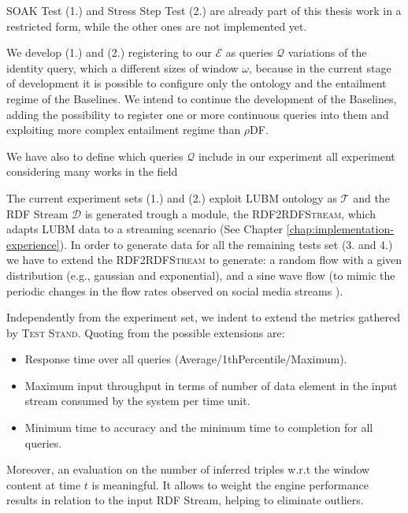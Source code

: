 SOAK Test (1.) and Stress Step Test (2.) are already part of this thesis work in a restricted form, while the other ones are not implemented yet. 

We develop (1.) and (2.) registering to our $\mathcal{E}$ as queries $\mathcal{Q}$ variations of the identity query, which a different sizes of window $\omega$, because in the current stage of development it is possible to configure only the ontology and the entailment regime of the Baselines. We intend to continue the development of the Baselines, adding the possibility to register one or more continuous queries into them and exploiting more complex entailment regime than $\rho$DF. 

We have also to define which queries $\mathcal{Q}$ include in our experiment all experiment considering many works in the field \cite{DBLP:conf/esws/ScharrenbachUMVB13, Zhang2012, LePhuoc2012c, DBLP:conf/semweb/DellAglioCBCV13}

The current experiment sets (1.) and (2.) exploit LUBM ontology as $\mathcal{T}$ and the RDF Stream $\mathcal{D}$ is generated trough a module, the \textsc{RDF2RDFStream}, which adapts LUBM data to a streaming scenario (See Chapter \ref{chap:implementation-experience}). In order to generate data for all the remaining tests set (3. and 4.) we have to extend the \textsc{RDF2RDFStream} to generate: a random flow with a given distribution (e.g., gaussian and exponential), and a sine wave flow (to mimic the periodic changes in the flow rates observed on social media streams \cite{DBLP:conf/semweb/BalduiniVDTPC13}).

Independently from the experiment set, we indent to extend the metrics gathered by \name \textsc{Test Stand}. Quoting from \cite{DBLP:conf/esws/ScharrenbachUMVB13} the possible extensions are:
\begin{itemize}
\item Response time over all queries (Average/1thPercentile/Maximum).
\item Maximum input throughput in terms of number of data element in the input stream consumed by the system per time unit.
\item Minimum time to accuracy and the minimum time to completion for all queries.
\end{itemize}

Moreover, an evaluation on the number of inferred triples w.r.t the window content at time $t$ is meaningful. It allows to weight the engine performance results in relation to the input RDF Stream, helping to eliminate outliers.\\




